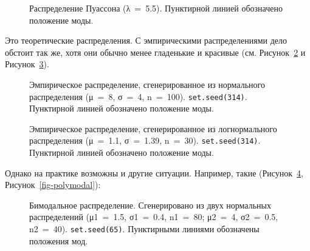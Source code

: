 \documentclass[
  letterpaper,
]{scrbook}
\theoremstyle{definition}
\theoremstyle{remark}
\begin{document}
\begin{figure}


\caption{\label{fig-poiss-mode}Распределение Пуассона (λ~=~5.5).
Пунктирной линией обозначено положение моды.}

\end{figure}%

Это теоретические распределения. С эмпирическими распределениями дело
обстоит так же, хотя они обычно менее гладенькие и красивые (см.
Рисунок~\ref{fig-mode-norm-sample} и
Рисунок~\ref{fig-mode-nbinom-sample}).

\begin{figure}


\caption{\label{fig-mode-norm-sample}Эмпирическое распределение,
сгенерированное из нормального распределения (μ~=~8, σ~=~4, n~=~100).
\texttt{set.seed(314)}. Пунктирной линией обозначено положение моды.}

\end{figure}%

\begin{figure}


\caption{\label{fig-mode-nbinom-sample}Эмпирическое распределение,
сгенерированное из логнормального распределения (μ~=~1.1, σ~=~1.39,
n~=~30). \texttt{set.seed(314)}. Пунктирной линией обозначено положение
моды.}

\end{figure}%

Однако на практике возможны и другие ситуации. Например, такие
(Рисунок~\ref{fig-bimodal}, Рисунок~\ref{fig-polymodal}):

\begin{figure}


\caption{\label{fig-bimodal}Бимодальное распределение. Сгенерировано из
двух нормальных распределений (μ1~=~1.5, σ1~=~0.4, n1~=~80; μ2~=~4,
σ2~=~0.5, n2~=~40). \texttt{set.seed(65)}. Пунктирными линиями
обозначены положения мод.}

\end{figure}%
\end{document}
